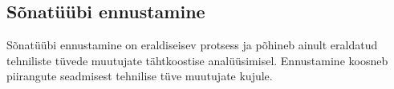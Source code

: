 \documentclass[12pt,a4paper]{article}
\begin{document}
%
%
%
%
%
%

\subsection{Sõnatüübi ennustamine}
\label{sec:ekstraktmorfoloogia-ennustamine}

Sõnatüübi ennustamine on eraldiseisev protsess ja põhineb ainult eraldatud tehniliste tüvede muutujate tähtkoostise analüüsimisel. Ennustamine koosneb piirangute seadmisest tehnilise tüve muutujate kujule.
\end{document}
